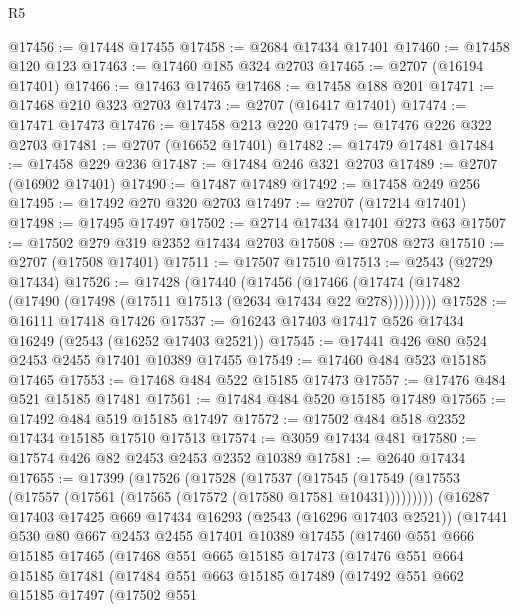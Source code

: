 \begin{lexlean}{R5}
\begin{coremodule}
@17456 := @17448 @17455
@17458 := @2684 @17434 @17401
@17460 := @17458 @120 @123
@17463 := @17460 @185 @324 @2703
@17465 := @2707 (@16194 @17401)
@17466 := @17463 @17465
@17468 := @17458 @188 @201
@17471 := @17468 @210 @323 @2703
@17473 := @2707 (@16417 @17401)
@17474 := @17471 @17473
@17476 := @17458 @213 @220
@17479 := @17476 @226 @322 @2703
@17481 := @2707 (@16652 @17401)
@17482 := @17479 @17481
@17484 := @17458 @229 @236
@17487 := @17484 @246 @321 @2703
@17489 := @2707 (@16902 @17401)
@17490 := @17487 @17489
@17492 := @17458 @249 @256
@17495 := @17492 @270 @320 @2703
@17497 := @2707 (@17214 @17401)
@17498 := @17495 @17497
@17502 := @2714 @17434 @17401 @273 @63
@17507 := @17502 @279 @319 @2352 @17434 @2703
@17508 := @2708 @273
@17510 := @2707 (@17508 @17401)
@17511 := @17507 @17510
@17513 := @2543 (@2729 @17434)
@17526 := @17428
    (@17440
      (@17456 (@17466 (@17474 (@17482 (@17490 (@17498 (@17511 @17513 (@2634 @17434 @22 @278)))))))))
@17528 := @16111 @17418 @17426
@17537 := @16243 @17403 @17417 @526 @17434 @16249 (@2543 (@16252 @17403 @2521))
@17545 := @17441 @426 @80 @524 @2453 @2455 @17401 @10389 @17455
@17549 := @17460 @484 @523 @15185 @17465
@17553 := @17468 @484 @522 @15185 @17473
@17557 := @17476 @484 @521 @15185 @17481
@17561 := @17484 @484 @520 @15185 @17489
@17565 := @17492 @484 @519 @15185 @17497
@17572 := @17502 @484 @518 @2352 @17434 @15185 @17510 @17513
@17574 := @3059 @17434 @481
@17580 := @17574 @426 @82 @2453 @2453 @2352 @10389
@17581 := @2640 @17434
@17655 := @17399
    (@17526
      (@17528
        (@17537
          (@17545 (@17549 (@17553 (@17557 (@17561 (@17565 (@17572 (@17580 @17581 @10431)))))))))
        (@16287
          @17403
          @17425
          @669
          @17434
          @16293
          (@2543 (@16296 @17403 @2521))
          (@17441
            @530
            @80
            @667
            @2453
            @2455
            @17401
            @10389
            @17455
            (@17460
              @551
              @666
              @15185
              @17465
              (@17468
                @551
                @665
                @15185
                @17473
                (@17476
                  @551
                  @664
                  @15185
                  @17481
                  (@17484
                    @551
                    @663
                    @15185
                    @17489
                    (@17492
                      @551
                      @662
                      @15185
                      @17497
                      (@17502
                        @551

\end{coremodule}
\end{lexlean}
